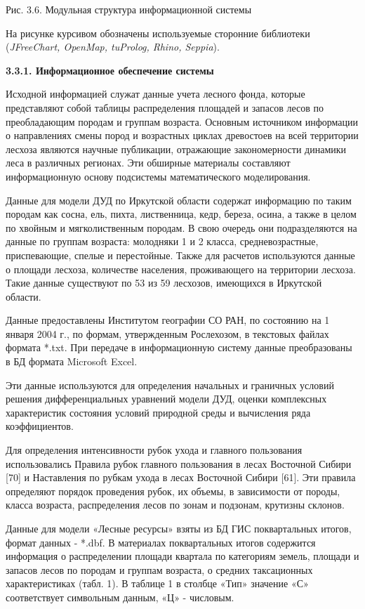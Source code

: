 \documentclass{article}
\begin{document}
\begin{center}
Рис. 3.6. Модульная структура информационной 
системы
\end{center}

На рисунке курсивом обозначены используемые 
 сторонние библиотеки (\textit{JFreeChart, OpenMap, tuProlog, 
Rhino, Seppia}).\label{HToc199746728}

\textbf{3.3.1. Информационное обеспечение системы 
}

Исходной информацией служат данные учета лесного 
фонда, которые представляют собой таблицы распределения 
площадей и запасов лесов по преобладающим породам 
и группам возраста. Основным источником информации 
о направлениях смены пород и возрастных циклах 
древостоев на всей территории лесхоза являются 
научные публикации, отражающие закономерности 
динамики леса в различных регионах. Эти обширные 
материалы составляют информационную основу 
подсистемы математического моделирования.

Данные для модели ДУД по Иркутской области 
содержат информацию по таким породам как сосна, 
ель, пихта, лиственница, кедр, береза, осина, 
а также в целом по хвойным и мягколиственным 
породам. В свою очередь они подразделяются 
на данные по группам возраста: молодняки 1 и 
2 класса, средневозрастные, приспевающие, спелые 
и перестойные. Также для расчетов используются 
данные о площади лесхоза, количестве населения, 
проживающего на территории лесхоза. Такие данные 
существуют по 53 из 59 лесхозов, имеющихся в Иркутской 
области.

Данные предоставлены Институтом географии 
СО РАН, по состоянию на 1 января 2004 г., по формам, 
утвержденным Рослехозом, в текстовых файлах 
формата *.txt. При передаче в информационную систему 
данные преобразованы в БД формата Microsoft Excel.

Эти данные используются для определения начальных 
и граничных условий решения дифференциальных 
уравнений модели ДУД, оценки комплексных характеристик 
состояния условий природной среды и вычисления 
ряда коэффициентов.

Для определения интенсивности рубок ухода 
и главного пользования использовались Правила 
рубок главного пользования в лесах Восточной 
Сибири [70] и Наставления по рубкам ухода в лесах 
Восточной Сибири [61]. Эти правила определяют 
порядок проведения рубок, их объемы, в зависимости 
от породы, класса возраста, распределения лесов 
по зонам и подзонам, крутизны склонов.

Данные для модели «Лесные ресурсы» взяты из 
БД ГИС поквартальных итогов, формат данных 
- *.dbf. В материалах поквартальных итогов содержится 
информация о распределении площади квартала 
по категориям земель, площади и запасов лесов 
по породам и группам возраста, о средних таксационных 
характеристиках (табл. 1). В таблице 1 в столбце 
«Тип» значение «С» соответствует символьным 
данным, «Ц» - числовым. 
\end{document}
